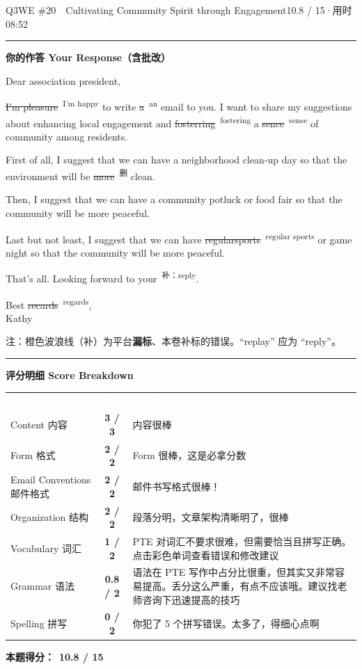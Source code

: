 \documentclass[11pt]{article}
\newcommand{\fix}[2]{%
  \colorbox{cWrongBg}{\textcolor{cWrong}{\sout{#1}}}%
  \,\textsuperscript{\textcolor{cFix}{\footnotesize #2}}}
\newcommand{\del}[1]{%
  \colorbox{cDelBg}{\textcolor{cDelete}{\sout{#1}}}%
  \,\textsuperscript{\textcolor{cDelete}{\footnotesize 删}}}
\newcommand{\add}[2]{%
  \textcolor{cAdd}{\uwave{#1}}%
  \,\textsuperscript{\textcolor{cAdd}{\footnotesize 补：#2}}}
\newcommand{\sfull}[1]{\textcolor{cFix}{\bfseries #1}}     %
\newcommand{\spart}[1]{\textcolor{cPartial}{\bfseries #1}} %
\newcommand{\szero}[1]{\textcolor{cWrong}{\bfseries #1}}   %
\newcommand{\ptesub}[1]{%
  \par\needspace{2\baselineskip}\smallskip
  {\color{cAccent}\rule[-0.2ex]{3pt}{1.05em}}\hspace{6pt}%
  {\bfseries\color{cHead}#1}\par\nopagebreak\smallskip}
\newcommand{\scorehead}{%
  \rowcolors{2}{cGrayBox}{white}
  \arrayrulecolor{cRule}}
\begin{document}
\begin{qblock}{Q3\quad WE \#20\ \ Cultivating Community Spirit through Engagement}{10.8 / 15\quad·\quad 用时 08:52}
\ptesub{你的作答 Your Response（含批改）}
\begin{youbox}
Dear association president,

\fix{I'm pleasure}{I'm happy} to write \fix{a}{an} email to you. I want to share my suggestions about enhancing local engagement and \fix{fosterring}{fostering} a \fix{sence}{sense} of community among residents.

First of all, I suggest that we can have a neighborhood clean-up day so that the environment will be \del{more} clean.

Then, I suggest that we can have a community potluck or food fair so that the community will be more peaceful.

Last but not least, I suggest that we can have \fix{regularsports}{regular sports} or game night so that the community will be more peaceful.

That's all. Looking forward to your \add{replay}{reply}.

Best \fix{recards}{regards},\\ Kathy
\end{youbox}
{\footnotesize\color{gray} 注：橙色波浪线（补）为平台\textbf{漏标}、本卷补标的错误。``replay'' 应为 ``reply''。}

\ptesub{评分明细 Score Breakdown}
{\small\scorehead
\begin{tabularx}{\linewidth}{l c Y}
\textcolor{white}{\bfseries 维度} & \textcolor{white}{\bfseries 得分} & \textcolor{white}{\bfseries AI 建议}\\
Content 内容              & \sfull{3 / 3}   & 内容很棒\\
Form 格式                & \sfull{2 / 2}   & Form 很棒，这是必拿分数\\
Email Conventions 邮件格式 & \sfull{2 / 2}   & 邮件书写格式很棒！\\
Organization 结构         & \sfull{2 / 2}   & 段落分明，文章架构清晰明了，很棒\\
Vocabulary 词汇           & \spart{1 / 2}   & PTE 对词汇不要求很难，但需要恰当且拼写正确。点击彩色单词查看错误和修改建议\\
Grammar 语法              & \spart{0.8 / 2} & 语法在 PTE 写作中占分比很重，但其实又非常容易提高。丢分这么严重，有点不应该哦。建议找老师咨询下迅速提高的技巧\\
Spelling 拼写             & \szero{0 / 2}   & 你犯了 5 个拼写错误。太多了，得细心点啊\\
\end{tabularx}}
\smallskip
\textbf{本题得分：}\ {\color{cAccent}\bfseries 10.8 / 15}

\end{qblock}
\end{document}
